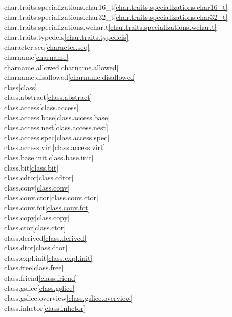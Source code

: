 \begin{multicols}{2}
char.traits.specializations.char16_t\quad\ref{char.traits.specializations.char16_t}\\
char.traits.specializations.char32_t\quad\ref{char.traits.specializations.char32_t}\\
char.traits.specializations.wchar.t\quad\ref{char.traits.specializations.wchar.t}\\
char.traits.typedefs\quad\ref{char.traits.typedefs}\\
character.seq\quad\ref{character.seq}\\
charname\quad\ref{charname}\\
charname.allowed\quad\ref{charname.allowed}\\
charname.disallowed\quad\ref{charname.disallowed}\\
class\quad\ref{class}\\
class.abstract\quad\ref{class.abstract}\\
class.access\quad\ref{class.access}\\
class.access.base\quad\ref{class.access.base}\\
class.access.nest\quad\ref{class.access.nest}\\
class.access.spec\quad\ref{class.access.spec}\\
class.access.virt\quad\ref{class.access.virt}\\
class.base.init\quad\ref{class.base.init}\\
class.bit\quad\ref{class.bit}\\
class.cdtor\quad\ref{class.cdtor}\\
class.conv\quad\ref{class.conv}\\
class.conv.ctor\quad\ref{class.conv.ctor}\\
class.conv.fct\quad\ref{class.conv.fct}\\
class.copy\quad\ref{class.copy}\\
class.ctor\quad\ref{class.ctor}\\
class.derived\quad\ref{class.derived}\\
class.dtor\quad\ref{class.dtor}\\
class.expl.init\quad\ref{class.expl.init}\\
class.free\quad\ref{class.free}\\
class.friend\quad\ref{class.friend}\\
class.gslice\quad\ref{class.gslice}\\
class.gslice.overview\quad\ref{class.gslice.overview}\\
class.inhctor\quad\ref{class.inhctor}\\

\end{multicols}
